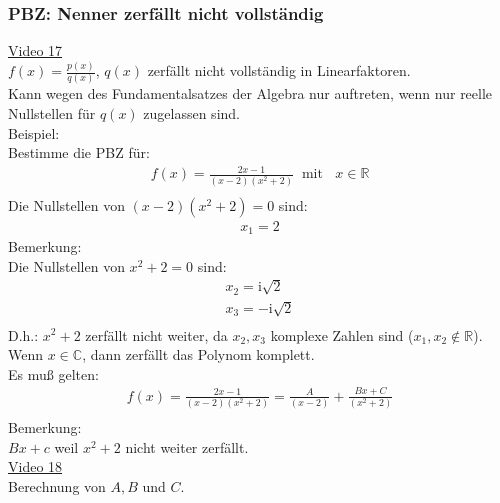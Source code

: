 \subsubsection{PBZ: Nenner zerfällt nicht vollständig }
\href{https://youtu.be/EepB1ozV-fQ}{Video 17}\\
$ f(x)=\frac{p(x)}{q(x)} $, $ q(x) $ zerfällt nicht vollständig in Linearfaktoren.\\
Kann wegen des Fundamentalsatzes der Algebra nur auftreten, wenn nur reelle Nullstellen für $ q(x) $ zugelassen sind.\\
Beispiel:\\
Bestimme die PBZ für:\\
\begin{align*}
f(x)=\frac{2x-1}{(x-2)(x^2+2)}\;\;\text{mit }\;\;x\in\mathbb{R}\\
\end{align*}
Die Nullstellen von $ (x-2)(x^2+2)=0 $ sind:\\
\begin{align*}
x_1=2
\end{align*}
Bemerkung:\\
Die Nullstellen von $ x^2+2=0 $ sind:\\
\begin{align*}
x_2=\mathrm{i}\sqrt{2}\\
x_3=-\mathrm{i}\sqrt{2}\\
\end{align*}
D.h.: $ x^2+2 $ zerfällt nicht weiter, da $ x_2, x_3 $ komplexe Zahlen sind ($x_1,x_2 \notin\mathbb{R} $). \\
Wenn $ x\in \mathbb{C} $, dann zerfällt das Polynom komplett.\vspace*{2mm}\\
Es muß gelten:\\
\begin{align*}
f(x)=\frac{2x-1}{(x-2)(x^2+2)}=\frac{A}{(x-2)}+\frac{Bx+C}{(x^2+2)}\\
\end{align*}
Bemerkung:\\
$ Bx+c $ weil $ x^2+2 $ nicht weiter zerfällt.\\
\href{https://youtu.be/FvWtzBpsLvk}{Video 18}\\
Berechnung von $ A,B $ und $ C $.\\
